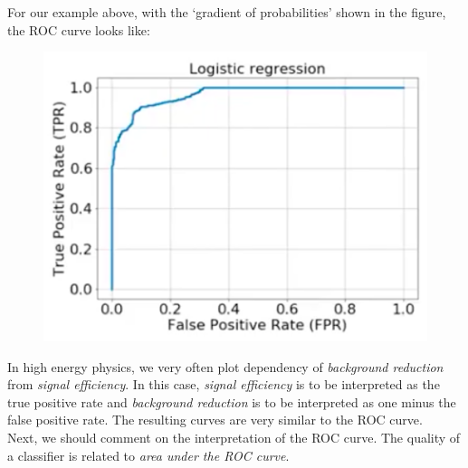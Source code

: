 \begin{frameex}
For our example above, with the `gradient of probabilities' shown in the figure, the ROC curve looks like:
\begin{figure}[H]
\centering
\includegraphics[scale=0.3]{roccurve.png}
\end{figure}
\end{frameex}


\newpage
In high energy physics, we very often plot dependency of \textit{background reduction} from \textit{signal efficiency}. In this case, \textit{signal efficiency} is to be interpreted as the true positive rate and \textit{background reduction} is to be interpreted as one minus the false positive rate. The resulting curves are very similar to the ROC curve.\\

Next, we should comment on the interpretation of the ROC curve. The quality of a classifier is related to \textit{area under the ROC curve}.

